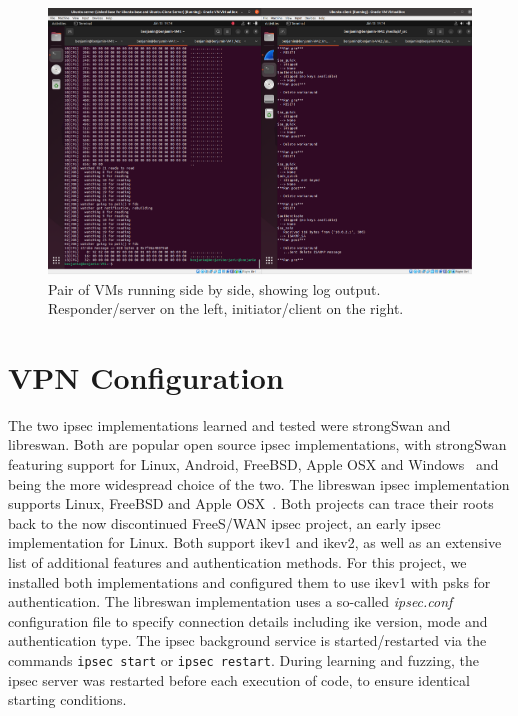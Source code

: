 \begin{figure}
	\centering
	\includegraphics[width=\linewidth]{images/VM_setup}
	\caption{Pair of VMs running side by side, showing log output. Responder/server on the left, initiator/client on the right.}
	\label{fig:vmsetup}
\end{figure}


\section{VPN Configuration} \label{sec:vpn_setup}
The two \ac{ipsec} implementations learned and tested were strongSwan and libreswan. Both are popular open source \ac{ipsec} implementations, with strongSwan featuring support for Linux, Android, FreeBSD, Apple OSX and Windows~\cite{doc:strongswan} and being the more widespread choice of the two. The libreswan \ac{ipsec} implementation supports Linux, FreeBSD and Apple OSX~\cite{doc:libreswan}. Both projects can trace their roots back to the now discontinued FreeS/WAN \ac{ipsec} project, an early \ac{ipsec} implementation for Linux. Both support \ac{ike}v1 and \ac{ike}v2, as well as an extensive list of additional features and authentication methods. For this project, we installed both implementations and configured them to use \ac{ike}v1 with \acp{psk} for authentication. The libreswan implementation uses a so-called \emph{ipsec.conf} configuration file to specify connection details including \ac{ike} version, mode and authentication type. The \ac{ipsec} background service is started/restarted via the commands \texttt{ipsec start} or \texttt{ipsec restart}. During learning and fuzzing, the \ac{ipsec} server was restarted before each execution of code, to ensure identical starting conditions.

